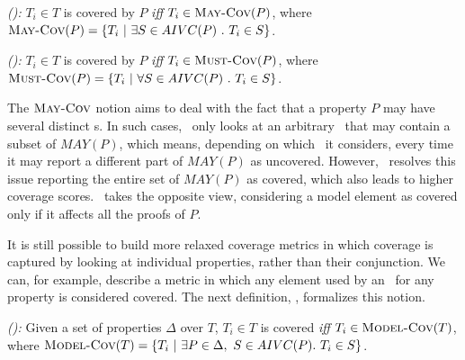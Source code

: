 \begin{definition} {\emph{(\maycov):}}
  \label{def:comp-1}
 $T_i \in T$ is covered by $P$ \emph{iff} $T_i \in \text{\sc May-Cov} (P)$, where
   $\text{\sc May-Cov} (P) = \{T_i ~|~ \exists S \in AIVC(P)~.~T_i \in S \}$.
\end{definition}

\begin{definition} {\emph{(\mustcov):}}
  \label{def:mustcov}
 $T_i \in T$ is covered by $P$ \emph{iff} $T_i \in \text{\sc Must-Cov} (P)$, where
   $\text{\sc Must-Cov} (P) = \{T_i ~|~ \forall S \in AIVC(P)~.~T_i \in S \}$.
\end{definition}

The $\text{\sc May-Cov}$ notion aims to deal with the fact that a property $P$ may have
several distinct \mivc s. In such cases, \ivccov\ only looks at an arbitrary \mivc\
that may contain a subset of $MAY(P)$, which means, depending on
which \mivc\ it considers, every time it may report a different part of $MAY(P)$
as uncovered. However, \maycov\ resolves this issue reporting the entire set of $MAY(P)$ as covered, which also leads to higher coverage scores.  \mustcov\ takes the opposite view, considering a model element as covered only if it affects all the proofs of $P$.


It is still possible to build more relaxed coverage metrics in which coverage
is captured by looking at individual properties, rather than their conjunction.
We can, for example, describe a metric in which any element used by an \mivc ~for any property is considered covered.
%
The next definition, \allcov, formalizes this notion.
\begin{definition} {\emph{(\allcov):}}
  \label{def:comp-2}
     Given a set of properties $\Delta$ over $T$, $T_i \in T$ is covered
   \emph{iff} $T_i \in \text{\sc Model-Cov} (T)$, where
   $\text{\sc Model-Cov} (T) = \{T_i ~|~ \exists P \in \Delta ,~ S \in AIVC(P).~T_i \in S \}$.
\end{definition}


